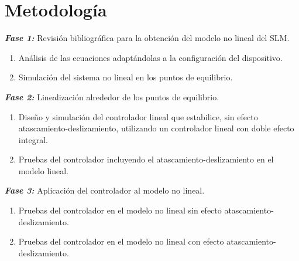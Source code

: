 \chapter{Metodología}

\begin{sloppypar}
\textbf{\textit{Fase 1:}} Revisión bibliográfica para la obtención del modelo no lineal del SLM.

\begin{enumerate}
  \item[a)] Análisis de las ecuaciones adaptándolas a la configuración del dispositivo.
  \item[b)] Simulación del sistema no lineal en los puntos de equilibrio.
\end{enumerate}

\textbf{\textit{Fase 2:}} Linealización alrededor de los puntos de equilibrio.

\begin{enumerate}
  \item[a)] Diseño y simulación del controlador lineal que estabilice, sin efecto atascamiento-deslizamiento, utilizando un controlador lineal con doble efecto integral.
  \item[b)] Pruebas del controlador incluyendo el atascamiento-deslizamiento en el modelo lineal.
\end{enumerate}

\textbf{\textit{Fase 3:}} Aplicación del controlador al modelo no lineal.

\begin{enumerate}
  \item[a)] Pruebas del controlador en el modelo no lineal sin efecto atascamiento-deslizamiento.
  \item[b)] Pruebas del controlador en el modelo no lineal con efecto atascamiento-deslizamiento.
\end{enumerate}
\end{sloppypar}